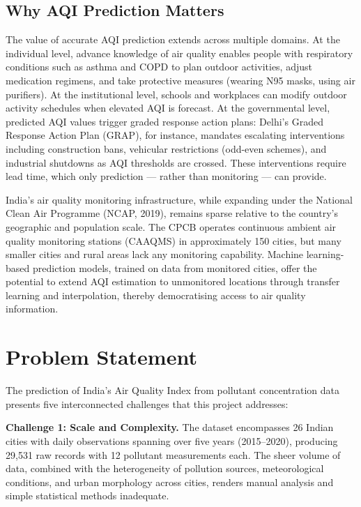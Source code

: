 \documentclass[12pt,a4paper]{report}
\begin{document}
\subsection{Why AQI Prediction Matters}

The value of accurate AQI prediction extends across multiple domains. At the individual level, advance knowledge of air quality enables people with respiratory conditions such as asthma and COPD to plan outdoor activities, adjust medication regimens, and take protective measures (wearing N95 masks, using air purifiers). At the institutional level, schools and workplaces can modify outdoor activity schedules when elevated AQI is forecast. At the governmental level, predicted AQI values trigger graded response action plans: Delhi's Graded Response Action Plan (GRAP), for instance, mandates escalating interventions including construction bans, vehicular restrictions (odd-even schemes), and industrial shutdowns as AQI thresholds are crossed. These interventions require lead time, which only prediction --- rather than monitoring --- can provide.

India's air quality monitoring infrastructure, while expanding under the National Clean Air Programme (NCAP, 2019), remains sparse relative to the country's geographic and population scale. The CPCB operates continuous ambient air quality monitoring stations (CAAQMS) in approximately 150 cities, but many smaller cities and rural areas lack any monitoring capability. Machine learning-based prediction models, trained on data from monitored cities, offer the potential to extend AQI estimation to unmonitored locations through transfer learning and interpolation, thereby democratising access to air quality information.

\section{Problem Statement}

The prediction of India's Air Quality Index from pollutant concentration data presents five interconnected challenges that this project addresses:

\textbf{Challenge 1: Scale and Complexity.} The dataset encompasses 26 Indian cities with daily observations spanning over five years (2015--2020), producing 29,531 raw records with 12 pollutant measurements each. The sheer volume of data, combined with the heterogeneity of pollution sources, meteorological conditions, and urban morphology across cities, renders manual analysis and simple statistical methods inadequate.
\end{document}
